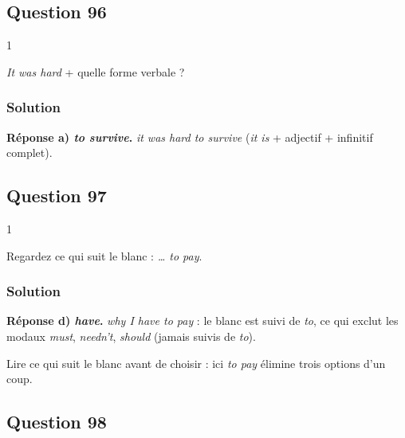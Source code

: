 \documentclass[11pt,a4paper]{article}
\begin{document}
\hypertarget{question-96}{%
\subsection{Question 96}\label{question-96}}

\begin{indication}{1}

\emph{It was hard} + quelle forme verbale ?

\end{indication}

\hypertarget{solution-95}{%
\subsubsection{Solution}\label{solution-95}}

\textbf{Réponse a) \emph{to survive}.} \emph{it was hard to survive} (\emph{it is} + adjectif + infinitif complet).

\hypertarget{question-97}{%
\subsection{Question 97}\label{question-97}}

\begin{indication}{1}

Regardez ce qui suit le blanc : \emph{\ldots{} to pay}.

\end{indication}

\hypertarget{solution-96}{%
\subsubsection{Solution}\label{solution-96}}

\textbf{Réponse d) \emph{have}.} \emph{why I have to pay} : le blanc est suivi de \emph{to}, ce qui exclut les modaux \emph{must}, \emph{needn't}, \emph{should} (jamais suivis de \emph{to}).

\begin{methode}

Lire ce qui suit le blanc avant de choisir : ici \emph{to pay} élimine trois options d'un coup.

\end{methode}

\hypertarget{question-98}{%
\subsection{Question 98}\label{question-98}}
\end{document}
